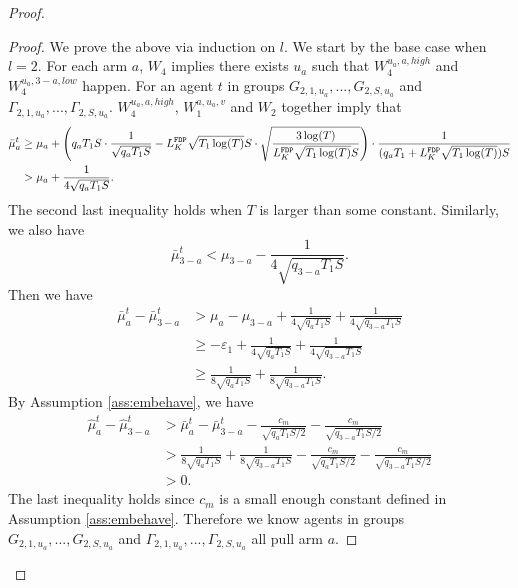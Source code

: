 \begin{proof}
\begin{proof}
We prove the above via induction on $l$. %
We start by the base case when $l=2$. For each arm $a$, $W_4$ implies there exists $u_a$ such that $W^{u_a,a,high}_4$ and $W^{u_a,3-a,low}_4$ happen. For an agent $t$  in groups $G_{2,1,u_a},...,G_{2,S,u_a}$ and $\Gamma_{2,1,u_a},...,\Gamma_{2,S,u_a}$.
$W_4^{u_a,a,high}$,  $W_1^{a,u_a,v}$ and $W_2$ together imply that 
\begin{align*}
\bar{\mu}_a ^t &\geq \mu_a + \left(q_aT_1S \cdot \frac{1}{\sqrt{q_aT_1S}} - L^\mathtt{FDP}_K \sqrt{T_1\log(T)} S\cdot \sqrt{\frac{3\log(T)}{ L^\mathtt{FDP}_K \sqrt{T_1\log(T)}S}} \right) \cdot \frac{1}{(q_a T_1+ L^\mathtt{FDP}_K \sqrt{T_1\log(T)})S} \\
&> \mu_a + \frac{1}{4\sqrt{q_aT_1S}}.
\end{align*}
The second last inequality holds when $T$ is larger than some constant.
Similarly, we also have
\[
\bar{\mu}_{3-a}^t< \mu_{3-a}   - \frac{1}{4\sqrt{q_{3-a} T_1S}}.
\]
Then we have
\begin{align*}
\bar{\mu}^t_a - \bar{\mu}^t_{3-a} &> \mu_a - \mu_{3-a} + \frac{1}{4\sqrt{q_aT_1S}} + \frac{1}{4\sqrt{q_{3-a} T_1S}}\\
&\geq -\varepsilon_1+ \frac{1}{4\sqrt{q_aT_1S}} + \frac{1}{4\sqrt{q_{3-a} T_1S}}\\
&\geq \frac{1}{8\sqrt{q_aT_1S}} + \frac{1}{8\sqrt{q_{3-a} T_1S}}.
\end{align*}
By Assumption \ref{ass:embehave}, we have
\begin{align*}
\hat{\mu}_a^t - \hat{\mu}_{3-a}^t &> \bar{\mu}^t_a - \bar{\mu}^t_{3-a} -  \frac{c_m}{\sqrt{q_aT_1S/2}} - \frac{c_m}{\sqrt{q_{3-a} T_1S/2}}\\
&> \frac{1}{8\sqrt{q_aT_1S}} + \frac{1}{8\sqrt{q_{3-a} T_1S}} -   \frac{c_m}{\sqrt{q_aT_1S/2}} - \frac{c_m}{\sqrt{q_{3-a} T_1S/2}}\\
&>0.
\end{align*}
The last inequality holds since $c_m$ is a small enough constant defined in Assumption \ref{ass:embehave}. Therefore we know agents in groups $G_{2,1,u_a},...,G_{2,S,u_a}$ and $\Gamma_{2,1,u_a},...,\Gamma_{2,S,u_a}$ all pull arm $a$.


\end{proof}
\end{proof}
